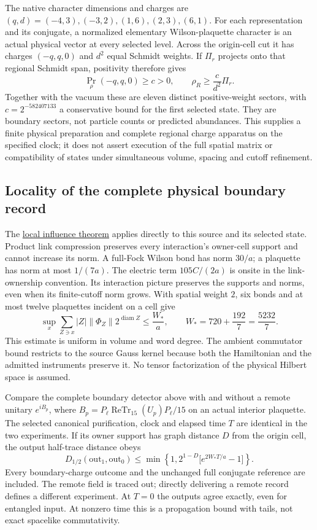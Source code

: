 The native character dimensions and charges are
$(q,d)=(-4,3),(-3,2),(1,6),(2,3),(6,1)$.
For each representation and its conjugate, a normalized elementary
Wilson-plaquette character is an actual physical vector at every selected
level. Across the origin-cell cut it has charges $(-q,q,0)$ and $d^2$
equal Schmidt weights. If $\Pi_r$ projects onto that regional Schmidt
span, positivity therefore gives
\[
 \Pr_\rho(-q,q,0)\ge c>0,\qquad
 \rho_R\ge\frac{c}{d^2}\Pi_r.
\]
Together with the vacuum these are eleven distinct positive-weight
sectors, with $c=2^{-582407133}$ a conservative bound for the first
selected state. They are boundary sectors, not particle counts or
predicted abundances. This supplies a finite physical preparation and
complete regional charge apparatus on the specified clock; it does not
assert execution of the full spatial matrix or compatibility of states
under simultaneous volume, spacing and cutoff refinement.

\subsection{Locality of the complete physical boundary record}

The \href{https://github.com/FloatingPragma/observer-patch-holography/blob/main/model/particle_primary_locality/PROOF.md}{local influence theorem}
applies directly to this source and its selected state. Product link
compression preserves every interaction's owner-cell support and cannot
increase its norm. A full-Fock Wilson bond has norm $30/a$; a plaquette
has norm at most $1/(7a)$. The electric term $105C/(2a)$ is onsite in
the link-ownership convention. Its interaction picture preserves the
supports and norms, even when its finite-cutoff norm grows. With spatial
weight $2$, six bonds and at most twelve plaquettes incident on a cell give
\[
 \sup_x\sum_{Z\ni x}|Z|\|\Phi_Z\|2^{\operatorname{diam}Z}
 \le\frac{W_*}{a},\qquad W_*=720+\frac{192}{7}=\frac{5232}{7}.
\]
This estimate is uniform in volume and word degree. The ambient
commutator bound restricts to the source Gauss kernel because both the
Hamiltonian and the admitted instruments preserve it. No tensor
factorization of the physical Hilbert space is assumed.

Compare the complete boundary detector above with and without a remote
unitary $e^{iB_p}$, where
$B_p=P_\ell\operatorname{ReTr}_{15}(U_p)P_\ell/15$ on an actual interior
plaquette. The selected canonical purification, clock and elapsed time
$T$ are identical in the two experiments. If its owner support has graph
distance $D$ from the origin cell, the output half-trace distance obeys
\[
 D_{1/2}(\mathrm{out}_1,\mathrm{out}_0)
 \le \min\!\left\{1,2^{1-D}
       \bigl[e^{2W_*T/a}-1\bigr]\right\}.
\]
Every boundary-charge outcome and the unchanged full conjugate reference
are included. The remote field is traced out; directly delivering a
remote record defines a different experiment. At $T=0$ the outputs agree
exactly, even for entangled input. At nonzero time this is a propagation
bound with tails, not exact spacelike commutativity.

